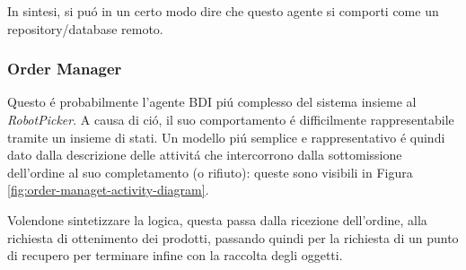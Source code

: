 In sintesi, si pu\'o in un certo modo dire che questo agente si comporti come un repository/database remoto.

\subsubsection{Order Manager}
Questo \'e probabilmente l'agente BDI pi\'u complesso del sistema insieme al \textit{RobotPicker}. A causa di ci\'o, il suo comportamento \'e difficilmente rappresentabile tramite un insieme di stati. Un modello pi\'u semplice e rappresentativo \'e quindi dato dalla descrizione delle attivit\'a che intercorrono dalla sottomissione dell'ordine al suo completamento (o rifiuto): queste sono visibili in Figura \ref{fig:order-managet-activity-diagram}.

Volendone sintetizzare la logica, questa passa dalla ricezione dell'ordine, alla richiesta di ottenimento dei prodotti, passando quindi per la richiesta di un punto di recupero per terminare infine con la raccolta degli oggetti.

